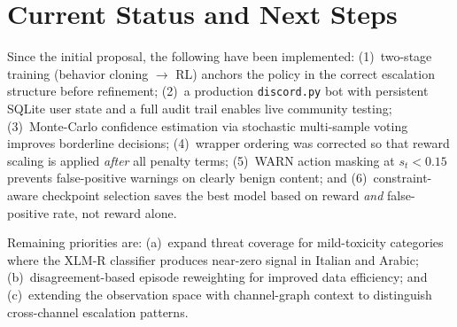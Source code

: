 \documentclass[journal]{IEEEtran}
\begin{document}
\section{Current Status and Next Steps}

Since the initial proposal, the following have been implemented:
(1)~two-stage training (behavior cloning $\to$ RL) anchors the policy in the correct
escalation structure before refinement; (2)~a production \texttt{discord.py} bot with
persistent SQLite user state and a full audit trail enables live community testing;
(3)~Monte-Carlo confidence estimation via stochastic multi-sample voting improves
borderline decisions; (4)~wrapper ordering was corrected so that reward scaling is
applied \emph{after} all penalty terms; (5)~WARN action masking at $s_t < 0.15$ prevents
false-positive warnings on clearly benign content; and (6)~constraint-aware checkpoint
selection saves the best model based on reward \emph{and} false-positive rate, not reward
alone.

Remaining priorities are: (a)~expand threat coverage for mild-toxicity categories where
the XLM-R classifier produces near-zero signal in Italian and Arabic;
(b)~disagreement-based episode reweighting for improved data efficiency; and
(c)~extending the observation space with channel-graph context to distinguish
cross-channel escalation patterns.
\end{document}
